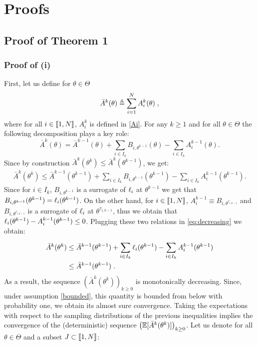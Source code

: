 \section{Proofs}\label{sec:proofs}

\subsection{Proof of Theorem 1}\label{proofs:IEM}
\subsubsection{Proof of (i)}
First, let us define for $\theta \in \Theta$
\begin{equation}\label{sumsurrogate}
 \bar{A}^k(\theta) \triangleq \sum_{i=1}^{N}{A^k_i(\theta)}\;,
\end{equation}
where for all $i \in \llbracket1,N\rrbracket$, $A^{k}_{i}$ is defined in \eqref{Ai}. For any $k \geq 1$ and for all $\theta \in \Theta$ the following decomposition plays a key role:
\begin{equation}\label{deterquantity}
\bar{A}^k(\theta) = \bar{A}^{k-1}(\theta) + \sum_{i \in I_{k}}^{}{B_{i,\theta^{k-1}}(\theta)} - \sum_{i \in I_{k}}^{}{A^{k-1}_{i}(\theta)}.
\end{equation}
Since by construction $\bar{A}^k(\theta^k) \leq  \bar{A}^k(\theta^{k-1})$, we get:
\begin{align}\label{eq:decreasing}
\bar{A}^k(\theta^k) \leq \bar{A}^{k-1}(\theta^{k-1}) + \sum_{i \in I_{k}}^{}{B_{i,\theta^{k-1}}(\theta^{k-1})} - \sum_{i \in I_{k}}^{}{A^{k-1}_{i}(\theta^{k-1})}.
\end{align}
Since for $i \in I_k$, $B_{i,\theta^{k-1}}$ is a surrogate of $\ell_i$ at $\theta^{k-1}$ we get that  $B_{i,\theta^{k-1}}(\theta^{k-1}) = \ell_{i}(\theta^{k-1})$. On the other hand, for $i \in \llbracket1,N\rrbracket$, $A^{k-1}_{i} \equiv B_{i,\theta^{\tau_{i,k-1}}}$ and $B_{i,\theta^{\tau_{i,k-1}}}$ is a surrogate of $\ell_i$ at $\theta^{\tau_{i,k-1}}$, thus we obtain that $ \ell_{i}(\theta^{k-1}) - A^{k-1}_{i}(\theta^{k-1}) \leq 0$. Plugging these two relations in \eqref{eq:decreasing}  we obtain:
\begin{align}
\bar{A}^k(\theta^k) & \leq \bar{A}^{k-1}(\theta^{k-1}) + \sum_{i \in I_{k}}^{}{\ell_{i}(\theta^{k-1})} - \sum_{i \in I_{k}}^{}{A^{k-1}_{i}(\theta^{k-1})}\\
& \leq \bar{A}^{k-1}(\theta^{k-1})\;.
\end{align}
As a result, the sequence $\left(\bar{A}^k(\theta^k)\right)_{k\geq0}$ is monotonically decreasing.  Since, under assumption \cref{bounded}, this quantity is bounded from below with probability one, we obtain its almost sure convergence. Taking the expectations with respect to the sampling distributions of the previous inequalities implies the convergence of the (deterministic) sequence $\left(\operatorname*{\mathbb{E}}[\bar{A}^k(\theta^k)]\right)_{k\geq0}$. Let us denote for all $\theta \in \Theta$ and a subset $J \subset \llbracket1,N\rrbracket$:
